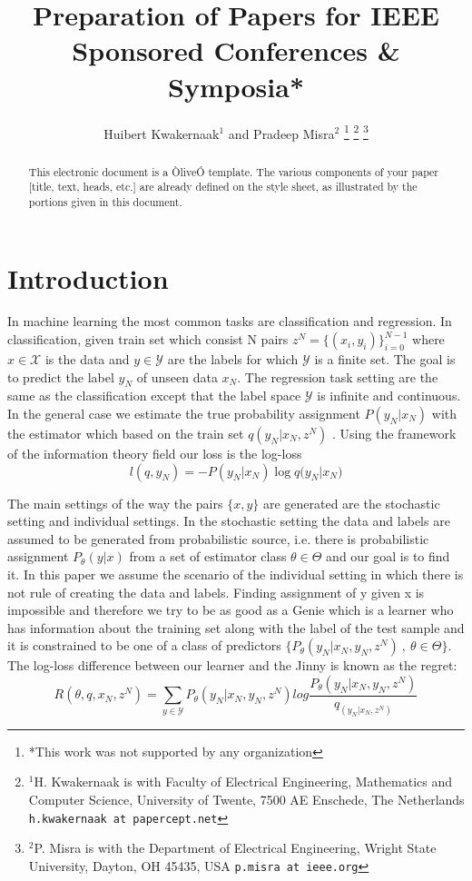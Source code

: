 \documentclass[letterpaper, 10 pt, conference]{ieeeconf}  %
\title{\LARGE \bf
Preparation of Papers for IEEE Sponsored Conferences \& Symposia*
}
\author{Huibert Kwakernaak$^{1}$ and Pradeep Misra$^{2}$%
\thanks{*This work was not supported by any organization}%
\thanks{$^{1}$H. Kwakernaak is with Faculty of Electrical Engineering, Mathematics and Computer Science,
        University of Twente, 7500 AE Enschede, The Netherlands
        {\tt\small h.kwakernaak at papercept.net}}%
\thanks{$^{2}$P. Misra is with the Department of Electrical Engineering, Wright State University,
        Dayton, OH 45435, USA
        {\tt\small p.misra at ieee.org}}%
}
\begin{document}
\maketitle
\thispagestyle{empty}
\pagestyle{empty}


\begin{abstract}

This electronic document is a ÒliveÓ template. The various components of your paper [title, text, heads, etc.] are already defined on the style sheet, as illustrated by the portions given in this document.

\end{abstract}






\section{Introduction} \label{Introduction}
In machine learning the most common tasks are classification and regression. In classification, given train set which consist N pairs $z^N=\{(x_i, y_i)\}_{i=0}^{N-1}$ where $x \in \mathcal{X}$ is the data and $y \in \mathcal{Y}$ are the labels for which $\mathcal{Y}$ is a finite set. The goal is to predict the label $y_N$ of unseen data $x_N$.  The regression task setting are the same as the classification except that the label space $\mathcal{Y}$ is infinite and continuous.
In the general case we estimate the true probability assignment $P(y_N|x_N)$  with the estimator which based on the train set $q(y_N|x_N, z^N)$ . Using the framework of the information theory field our loss is the log-loss
\begin{equation}
l(q,y_N) = -P(y_N|x_N)\log {q(y_N|x_N})
\end{equation}

The main settings of the way the pairs $\{x,y\}$ are generated are the stochastic setting and individual settings. In the stochastic setting the data and labels are assumed to be generated from probabilistic source, i.e. there is probabilistic assignment $P_\theta(y|x)$ from a set of estimator class $\theta \in \Theta$ and our goal is to find it. In this paper we assume the scenario of the individual setting in which there is not rule of creating the data and labels. Finding assignment of y given x is impossible and therefore we try to be as good as a Genie \cite{feder1992universal} which is a learner who has information about the training set along with the label of the test sample and it is constrained to be one of a class of predictors $\{P_\theta(y_N|x_N,y_N,z^N)\ , \ \theta \in \Theta \}$. The log-loss difference between our learner and the Jinny is known as the regret:
\begin{equation}
    R(\theta, q, x_N, z^N) = \sum_{y \in \mathcal{Y}} P_\theta(y_N|x_N,y_N,z^N) log \frac{P_\theta(y_N|x_N,y_N,z^N)}{q_(y_N|x_N, z^N)} 
\end{equation}
\end{document}
